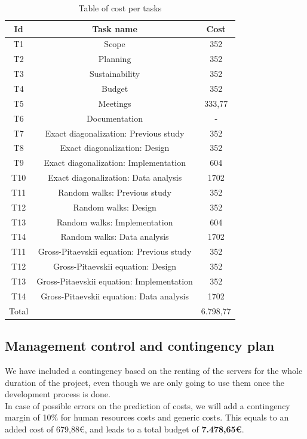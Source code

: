 \documentclass{article}
\begin{document}
\begin{table}[h!]
\centering
\begin{tabular}{|c|c|c|} 
 \hline
 Id & Task name & Cost \\
 \hline
 T1 & Scope & 352 \\
 T2 & Planning & 352 \\
 T3 & Sustainability & 352 \\
 T4 & Budget & 352 \\
 T5 & Meetings & 333,77 \\
 T6 & Documentation & - \\
 \hline
 T7 & Exact diagonalization: Previous study & 352 \\
 T8 & Exact diagonalization: Design & 352 \\
 T9 & Exact diagonalization: Implementation & 604 \\
 T10 & Exact diagonalization: Data analysis & 1702 \\
 \hline
 T11 & Random walks: Previous study & 352 \\
 T12 & Random walks: Design & 352 \\
 T13 & Random walks: Implementation & 604 \\
 T14 & Random walks: Data analysis & 1702 \\
 \hline
 T11 & Gross-Pitaevskii equation: Previous study & 352 \\
 T12 & Gross-Pitaevskii equation: Design & 352 \\
 T13 & Gross-Pitaevskii equation: Implementation & 352 \\
 T14 & Gross-Pitaevskii equation: Data analysis & 1702 \\
 \hline
 \hline
 Total &  & 6.798,77 \\
 \hline
\end{tabular}
\caption{Table of cost per tasks}
\label{table:4}
\end{table}



\subsection{Management control and contingency plan}
We have included a contingency based on the renting of the servers for the whole duration of the project, even though we are only going to use them once the development process is done. \\

In case of possible errors on the prediction of costs, we will add a contingency margin of 10\% for human resources costs and generic costs. This equals to an added cost of 679,88€, and leads to a total budget of \textbf{7.478,65€}.
\end{document}
